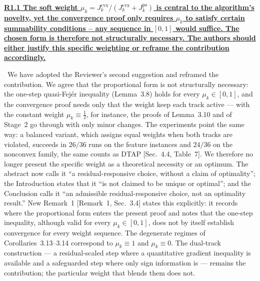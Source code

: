 \documentclass[11pt]{article}
\newcommand{\response}[1]{\smallskip\noindent{\color{blue!60!black}\textbf{Response.}}\ #1\par\medskip}
\newcommand{\loc}[1]{\textcolor{blue!50!black}{[#1]}}
\newenvironment{point}[1]{\medskip\noindent\textbf{\uline{#1}}\par}{\par}
\begin{document}
\begin{point}{R1.1 The soft weight $\mu_k=J_k^{\mathrm{cvx}}/(J_k^{\mathrm{cvx}}+J_k^{\mathrm{ps}})$
is central to the algorithm's novelty, yet the convergence proof only requires $\mu_k$ to
satisfy certain summability conditions -- any sequence in $[0,1]$ would suffice. The chosen
form is therefore not structurally necessary. The authors should either justify this
specific weighting or reframe the contribution accordingly.}
\response{We have adopted the Reviewer's second suggestion and reframed the contribution.
We agree that the proportional form is not structurally necessary: the one-step
quasi-Fej\'er inequality (Lemma~3.8) holds for every $\mu_k\in[0,1]$, and the convergence
proof needs only that the weight keep each track active --- with the constant weight
$\mu_k\equiv\tfrac12$, for instance, the proofs of Lemma~3.10 and of Stage~2 go through with
only minor changes. The experiments point the same way: a balanced variant, which assigns
equal weights when both tracks are violated, succeeds in $26/36$ runs on the feature
instances and $24/36$ on the nonconvex family, the same counts as DTAP \loc{Sec.~4.4,
Table~7}. We therefore no longer present the specific weight as a theoretical necessity or
an optimum. The abstract now calls it ``a residual-responsive choice, without a claim of
optimality''; the Introduction states that it ``is not claimed to be unique or optimal'';
and the Conclusion calls it ``an admissible residual-responsive choice, not an optimality
result.'' New Remark~1 \loc{Remark~1, Sec.~3.4} states this explicitly: it records where
the proportional form enters the present proof and notes that the one-step inequality,
although valid for every $\mu_k\in[0,1]$, does not by itself establish convergence for every
weight sequence. The degenerate regimes of Corollaries~3.13--3.14 correspond to
$\mu_k\equiv1$ and $\mu_k\equiv0$. The dual-track
construction --- a residual-scaled step where a quantitative gradient inequality is
available and a safeguarded step where only sign information is --- remains the
contribution; the particular weight that blends them does not.}
\end{point}
\end{document}
